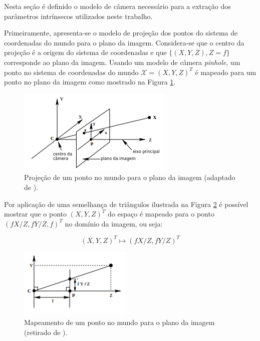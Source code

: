 {Nesta seção é definido o modelo de câmera necessário para a extração dos parâmetros intrínsecos utilizados neste trabalho. 

Primeiramente, apresenta-se o modelo de projeção dos pontos do sistema de coordenadas do mundo para o plano da imagem. Considera-se que o centro da projeção é a origem do sistema de coordenadas e que $\{(X,Y,Z), Z = f\}$ corresponde ao plano da imagem. Usando um modelo de câmera \textit{pinhole}, um ponto no sistema de coordenadas do mundo $\mathcal{X} = (X,Y,Z)^T$ é mapeado para um ponto no plano da imagem como mostrado na Figura \ref{fig:projeção}.

\begin{figure}[h!]
\centering
\includegraphics[width=.5\linewidth]{figs/TG_pinhole_1_pt.png}
\caption{Projeção de um ponto no mundo para o plano da imagem (adaptado de \cite{hartley2003multiple}).}
\label{fig:projeção}
\end{figure}

Por aplicação de uma semelhança de triângulos ilustrada na Figura \ref{fig:mapeamento} é possível mostrar que o ponto $(X,Y,Z)^T$ do espaço é mapeado para o ponto $(fX/Z,fY/Z,f)^T$ no domínio da imagem, ou seja:

\begin{equation}
(X,Y,Z)^T \mapsto (fX/Z,fY/Z)^T
\label{eq:3d_mapPonto}
\end{equation}


\begin{figure}[h!]
\centering
\includegraphics[width=.5\linewidth]{figs/TG_pinhole_2.png}
\caption{Mapeamento de um ponto no mundo para o plano da imagem (retirado de \cite{hartley2003multiple}).}
\label{fig:mapeamento}
\end{figure}

}
